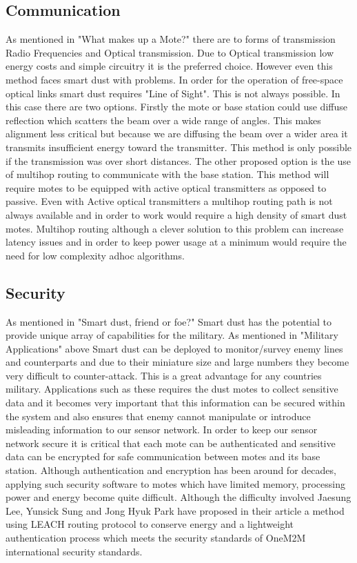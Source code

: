 \documentclass[article]{IEEEtran}
\begin{document}
\subsection{Communication}
As mentioned in "What makes up a Mote?" there are to forms of transmission Radio Frequencies and Optical transmission. Due to Optical transmission low energy costs and simple circuitry it is the preferred choice. However even this method faces smart dust with problems. 
In order for the operation of free-space optical links smart dust requires "Line of Sight"\cite{MobNet}. This is not always possible. In this case there are two options. Firstly the mote or base station could use diffuse reflection which scatters the beam over a wide range of angles. This makes alignment less critical but because we are diffusing the beam over a wider area it transmits insufficient energy toward the transmitter. This method is only possible if the transmission was over short distances. 
The other proposed option is the use of multihop routing to communicate with the base station. This method will require motes to be equipped with active optical transmitters as opposed to passive. Even with Active optical transmitters a multihop routing path is not always available and in order to work would require a high density of smart dust motes. Multihop routing although a clever solution to this problem can increase latency issues and in order to keep power usage at a minimum would require the need for low complexity adhoc algorithms\cite{MobNet}.

\subsection{Security}
As mentioned in "Smart dust, friend or foe?"\cite{friendorfoe} Smart dust has the potential to provide unique array of capabilities for the military. As mentioned in "Military Applications" above Smart dust can be deployed to monitor/survey enemy lines and counterparts and due to their miniature size and large numbers they become very difficult to counter-attack. This is a great advantage for any countries military. 
Applications such as these requires the dust motes to collect sensitive data and it becomes very important that this information can be secured within the system and also ensures that enemy cannot manipulate or introduce misleading information to our sensor network. 
In order to keep our sensor network secure it is critical that each mote can be authenticated and sensitive data can be encrypted for safe communication between motes and its base station. Although authentication and encryption has been around for decades, applying such security software to motes which have limited memory, processing power and energy become quite difficult. Although the difficulty involved Jaesung Lee, Yunsick Sung and Jong Hyuk Park have proposed in their article\cite{Lightweight} a method using LEACH routing protocol to conserve energy and a lightweight authentication process which meets the security standards of OneM2M international security standards.
\end{document}
